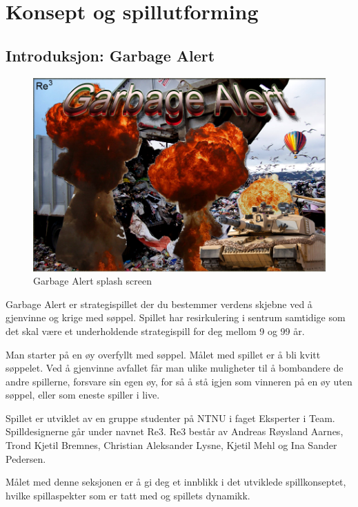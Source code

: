 \section{Konsept og spillutforming}\label{sec:konsept}

\subsection{Introduksjon: Garbage Alert}

			\begin{figure} [here]
				\begin{center}
					\includegraphics[scale=0.5]{images/splashscreen}
				\end{center}
			\caption{Garbage Alert splash screen}
		\end{figure}

Garbage Alert er strategispillet der du bestemmer verdens skjebne ved å gjenvinne og krige med søppel. Spillet har resirkulering i sentrum samtidige som det skal være et underholdende strategispill for deg mellom 9 og 99 år. 

Man starter på en øy overfyllt med søppel. Målet med spillet er å bli kvitt søppelet. Ved å gjenvinne avfallet får man ulike muligheter til å bombandere de andre spillerne, forsvare sin egen øy, for så å stå igjen som vinneren på en øy uten søppel, eller som eneste spiller i live.

Spillet er utviklet av en gruppe studenter på NTNU i faget Eksperter i Team. Spilldesignerne går under navnet Re3. Re3 består av Andreas Røysland Aarnes, Trond Kjetil Bremnes, Christian Aleksander Lysne, Kjetil Mehl og Ina Sander Pedersen.

Målet med denne seksjonen er å gi deg et innblikk i det utviklede spillkonseptet, hvilke spillaspekter som er tatt med og spillets dynamikk.


